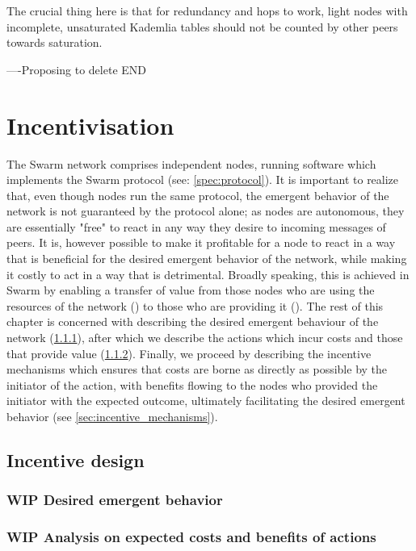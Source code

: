The crucial thing here is that for redundancy and hops to work, light nodes with   incomplete, unsaturated Kademlia tables should not be counted by other peers towards saturation.

----Proposing to delete END

\chapter{Incentivisation}\label{sec:incentivisation}
The Swarm network comprises independent nodes, running software which implements the Swarm protocol (see: \ref{spec:protocol}). It is important to realize that, even though nodes run the same protocol, the emergent behavior of the network is not guaranteed by the protocol alone; as nodes are autonomous, they are essentially "free" to react in any way they desire to incoming messages of peers.
It is, however possible to make it profitable for a node to react in a way that is beneficial for the desired emergent behavior of the network, while making it costly to act in a way that is detrimental. Broadly speaking, this is achieved in Swarm by enabling a transfer of value from those nodes who are using the resources of the network () to those who are providing it (). 
The rest of this chapter is concerned with describing the desired emergent behaviour of the network (\ref{sec:emergent_behavior}), after which we describe the actions which incur costs and those that provide value (\ref{sec:cost_benefit}). Finally, we proceed by describing the incentive mechanisms which ensures that costs are borne as directly as possible by the initiator of the action, with benefits flowing to the nodes who provided the initiator with the expected outcome, ultimately facilitating the desired emergent behavior (see \ref{sec:incentive_mechanisms}).

\section{Incentive design}
\subsection{WIP Desired emergent behavior}\label{sec:emergent_behavior}
\subsection{WIP Analysis on expected costs and benefits of actions}\label{sec:cost_benefit}
